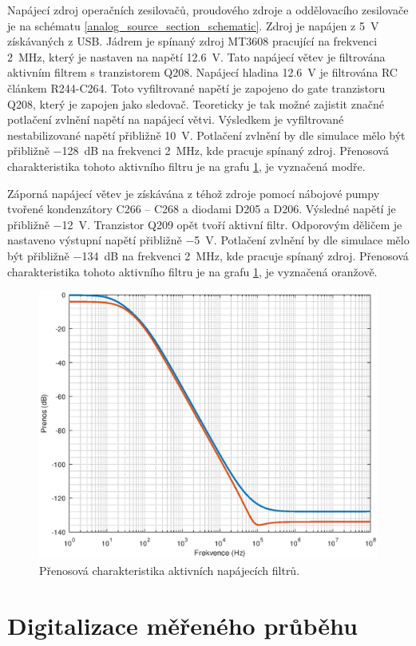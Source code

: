Napájecí zdroj operačních zesilovačů, proudového zdroje a oddělovacího zesilovače je na schématu \ref{analog_source_section_schematic}. Zdroj je napájen z \SI{5}{\volt} získávaných z USB. Jádrem je spínaný zdroj MT3608 pracující na frekvenci \SI{2}{\mega\hertz}, který je nastaven na napětí \SI{12.6}{\volt}. Tato napájecí větev je filtrována aktivním filtrem s tranzistorem Q208. Napájecí hladina \SI{12.6}{\volt} je filtrována RC článkem R244-C264. Toto vyfiltrované napětí je zapojeno do gate tranzistoru Q208, který je zapojen jako sledovač. Teoreticky je tak možné zajistit značné potlačení zvlnění napětí na napájecí větvi. Výsledkem je vyfiltrované nestabilizované napětí přibližně \SI{10}{\volt}. Potlačení zvlnění by dle simulace mělo být přibližně \SI{-128}{\deci\bel} na frekvenci \SI{2}{\mega\hertz}, kde pracuje spínaný zdroj. Přenosová charakteristika tohoto aktivního filtru je na grafu \ref{analog_source_filter_transfer}, je vyznačená modře.

Záporná napájecí větev je získávána z téhož zdroje pomocí nábojové pumpy tvořené kondenzátory C266 -- C268 a diodami D205 a D206. Výsledné napětí je přibližně \SI{-12}{\volt}. Tranzistor Q209 opět tvoří aktivní filtr. Odporovým děličem je nastaveno výstupní napětí přibližně \SI{-5}{\volt}. Potlačení zvlnění by dle simulace mělo být přibližně \SI{-134}{\deci\bel} na frekvenci \SI{2}{\mega\hertz}, kde pracuje spínaný zdroj. Přenosová charakteristika tohoto aktivního filtru je na grafu \ref{analog_source_filter_transfer}, je vyznačená oranžově.

\begin{figure}[htbp]
\includegraphics[width=\textwidth,keepaspectratio]{images/denoiser_transfer_function.eps}\caption{Přenosová charakteristika aktivních napájecích filtrů.}\label{analog_source_filter_transfer}
\end{figure}

\section{Digitalizace měřeného průběhu}